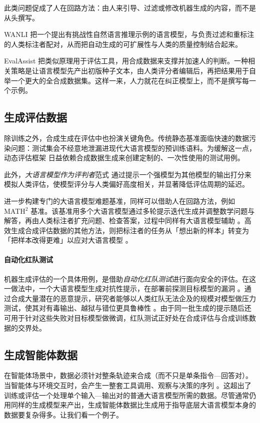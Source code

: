 此类问题促成了人在回路方法：由人来引导、过滤或修改机器生成的内容，而不是从头撰写。

WANLI \citep{liu-etal-2022-wanli} 把一个提出有挑战性自然语言推理示例的语言模型，与负责过滤和重标注的人类标注者配对，从而把自动生成的可扩展性与人类的质量控制结合起来。

EvalAssist \citep{santillan-cooper-etal-2025-synthetic} 把类似原理用于评估工具，用合成数据来支撑并加速人的判断。一种相关策略是让语言模型先产出初版种子文本，由人类评分者编辑后，再把结果用于自举一个更大的全合成数据集。这样一来，人力就花在纠正模型上，而不是撰写每一个示例。



\subsection{生成评估数据}
除训练之外，合成生成在评估中也扮演关键角色。传统静态基准面临快速的数据污染问题：测试集会不经意地泄漏进现代大语言模型的预训练语料。为缓解这一点，动态评估框架 \citep{kiela-etal-2021-dynabench} 日益依赖合成数据生成来创建定制的、一次性使用的测试用例。

此外，{\em 大语言模型作为评判者}范式 \citep{zheng2024judging} 通过提示一个强模型为其他模型的输出打分来模拟人类评估，使模型评分与人类偏好高度相关，并显著降低评估周期的延迟。

进一步构建专门的大语言模型难题基准，同样可以借助人在回路方法，例如 MATH$^2$ 基准。该基准用多个大语言模型通过多轮提示迭代生成并调整数学问题与解答，再由人类标注者扩充问题、检查答案，过程中同样有大语言模型辅助 \citep{shah2024ai}。高效生成合成评估数据的其他方法，则把标注者的任务从「想出新的样本」转变为「把样本改得更难」以应对大语言模型 \citep{yuan2021synthbio}。

\paragraph{自动化红队测试}
机器生成评估的一个具体用例，是借助\emph{自动化红队测试}进行面向安全的评估。在这一做法中，一个大语言模型生成对抗性提示，在部署前探测目标模型的漏洞 \citep{ganguli2022redteaminglanguagemodels}。通过合成大量潜在的恶意提示，研究者能够以人类红队无法企及的规模对模型做压力测试，使其对有毒输出、越狱与错位更具鲁棒性 \citep{perez-etal-2022-red}。由于同一批生成的提示随后还可用于针对这些失败对目标模型做微调，红队测试正好处在合成评估与合成训练数据的交界处。


\subsection{生成智能体数据}
在智能体场景中，数据必须针对整条轨迹来合成（而不只是单条指令—回答对）。当智能体与环境交互时，会产生一整套工具调用、观察与决策的序列 \citep{kang2025distilling}。这超出了训练或评估一个处理单个输入—输出对的普通大语言模型所需的数据。尽管通常仍用同样的生成模型来产出，生成智能体数据比生成用于指导底层大语言模型本身的数据要复杂得多。让我们看一个例子。


